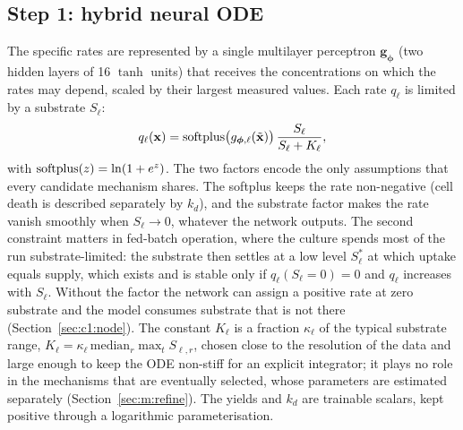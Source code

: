 \subsection{Step 1: hybrid neural ODE}\label{sec:m:node}
The specific rates are represented by a single multilayer perceptron $\mathbf{g}_{\boldsymbol{\phi}}$ (two hidden layers of 16 $\tanh$ units) that receives the concentrations on which the rates may depend, scaled by their largest measured values. Each rate $q_\ell$ is limited by a substrate $S_\ell$:
\begin{equation}
q_\ell(\mathbf{x}) = \operatorname{softplus}\!\big(g_{\boldsymbol{\phi},\ell}(\tilde{\mathbf{x}})\big)\,\frac{S_\ell}{S_\ell + K_\ell},
\label{eq:rate}
\end{equation}
with $\operatorname{softplus}(z)=\ln(1+e^{z})$.
The two factors encode the only assumptions that every candidate mechanism shares. The softplus keeps the rate non-negative (cell death is described separately by $k_d$), and the substrate factor makes the rate vanish smoothly when $S_\ell\to 0$, whatever the network outputs. The second constraint matters in fed-batch operation, where the culture spends most of the run substrate-limited: the substrate then settles at a low level $S^*_\ell$ at which uptake equals supply, which exists and is stable only if $q_\ell(S_\ell=0)=0$ and $q_\ell$ increases with $S_\ell$. Without the factor the network can assign a positive rate at zero substrate and the model consumes substrate that is not there (Section~\ref{sec:c1:node}). The constant $K_\ell$ is a fraction $\kappa_\ell$ of the typical substrate range, $K_\ell=\kappa_\ell\,\mathrm{median}_r\max_t S_{\ell,r}$, chosen close to the resolution of the data and large enough to keep the ODE non-stiff for an explicit integrator; it plays no role in the mechanisms that are eventually selected, whose parameters are estimated separately (Section~\ref{sec:m:refine}). The yields and $k_d$ are trainable scalars, kept positive through a logarithmic parameterisation.

